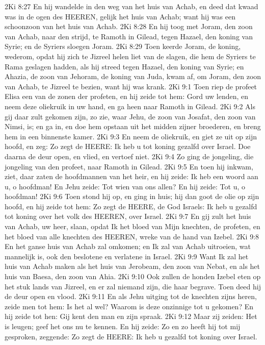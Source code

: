 2Ki 8:27  En hij wandelde in den weg van het huis van Achab, en deed dat kwaad was in de ogen des HEEREN, gelijk het huis van Achab; want hij was een schoonzoon van het huis van Achab.
2Ki 8:28  En hij toog met Joram, den zoon van Achab, naar den strijd, te Ramoth in Gilead, tegen Hazael, den koning van Syrie; en de Syriers sloegen Joram.
2Ki 8:29  Toen keerde Joram, de koning, wederom, opdat hij zich te Jizreel helen liet van de slagen, die hem de Syriers te Rama geslagen hadden, als hij streed tegen Hazael, den koning van Syrie; en Ahazia, de zoon van Jehoram, de koning van Juda, kwam af, om Joram, den zoon van Achab, te Jizreel te bezien, want hij was krank.
2Ki 9:1  Toen riep de profeet Elisa een van de zonen der profeten, en hij zeide tot hem: Gord uw lenden, en neem deze oliekruik in uw hand, en ga heen naar Ramoth in Gilead.
2Ki 9:2  Als gij daar zult gekomen zijn, zo zie, waar Jehu, de zoon van Josafat, den zoon van Nimsi, is; en ga in, en doe hem opstaan uit het midden zijner broederen, en breng hem in een binnenste kamer.
2Ki 9:3  En neem de oliekruik, en giet ze uit op zijn hoofd, en zeg: Zo zegt de HEERE: Ik heb u tot koning gezalfd over Israel. Doe daarna de deur open, en vlied, en vertoef niet.
2Ki 9:4  Zo ging de jongeling, die jongeling van den profeet, naar Ramoth in Gilead.
2Ki 9:5  En toen hij inkwam, ziet, daar zaten de hoofdmannen van het heir, en hij zeide: Ik heb een woord aan u, o hoofdman! En Jehu zeide: Tot wien van ons allen? En hij zeide: Tot u, o hoofdman!
2Ki 9:6  Toen stond hij op, en ging in huis; hij dan goot de olie op zijn hoofd, en hij zeide tot hem: Zo zegt de HEERE, de God Israels: Ik heb u gezalfd tot koning over het volk des HEEREN, over Israel.
2Ki 9:7  En gij zult het huis van Achab, uw heer, slaan, opdat Ik het bloed van Mijn knechten, de profeten, en het bloed van alle knechten des HEEREN, wreke van de hand van Izebel.
2Ki 9:8  En het ganse huis van Achab zal omkomen; en Ik zal van Achab uitroeien, wat mannelijk is, ook den beslotene en verlatene in Israel.
2Ki 9:9  Want Ik zal het huis van Achab maken als het huis van Jerobeam, den zoon van Nebat, en als het huis van Baesa, den zoon van Ahia.
2Ki 9:10  Ook zullen de honden Izebel eten op het stuk lands van Jizreel, en er zal niemand zijn, die haar begrave. Toen deed hij de deur open en vlood.
2Ki 9:11  En als Jehu uitging tot de knechten zijns heren, zeide men tot hem: Is het al wel? Waarom is deze onzinnige tot u gekomen? En hij zeide tot hen: Gij kent den man en zijn spraak.
2Ki 9:12  Maar zij zeiden: Het is leugen; geef het ons nu te kennen. En hij zeide: Zo en zo heeft hij tot mij gesproken, zeggende: Zo zegt de HEERE: Ik heb u gezalfd tot koning over Israel.

